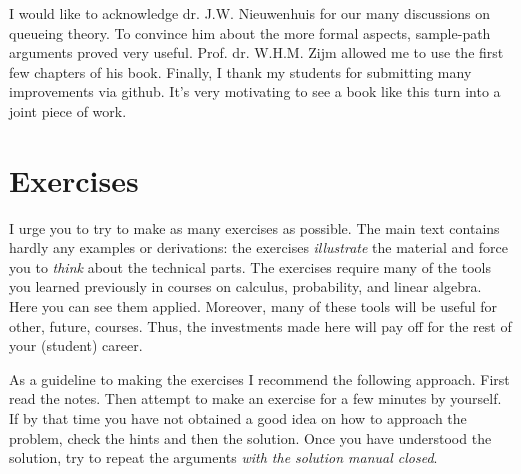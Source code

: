 
I would like to acknowledge dr.
J.W.
Nieuwenhuis for our many discussions on queueing theory.
To convince him about the more formal aspects, sample-path arguments proved very useful.
Prof.
dr.
W.H.M.
Zijm allowed me to use the first few chapters of his book.
Finally, I thank my students for submitting many improvements via github.
It's very motivating to see a book like this turn into a joint piece of work.

\section{Exercises}

I urge you to try to make as many exercises as possible.
The main text contains hardly any examples or derivations: the exercises \emph{illustrate} the material and force you to \textit{think} about the technical parts.
The exercises require many of the tools you learned previously in courses on calculus, probability, and linear algebra.
Here you can see them applied.
Moreover, many of these tools will be useful for other, future, courses.
Thus, the investments made here will pay off for the rest of your (student) career.


As a guideline to making the exercises I recommend the following approach.
First read the notes.
Then attempt to make an exercise for a few minutes  by yourself.
If by that time you have not obtained a good idea on how to approach the problem, check the hints and then the solution.
Once you have understood the solution, try to repeat the arguments \emph{with the solution manual closed}.

